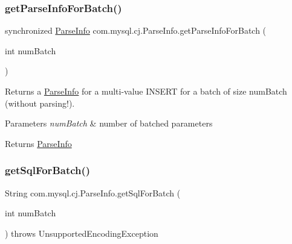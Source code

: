 \mbox{\label{classcom_1_1mysql_1_1cj_1_1_parse_info_afb6755fef767af487192ea4a4f589d24}} 
\subsubsection{\texorpdfstring{get\+Parse\+Info\+For\+Batch()}{getParseInfoForBatch()}}
{\footnotesize\ttfamily synchronized \mbox{\hyperlink{classcom_1_1mysql_1_1cj_1_1_parse_info}{Parse\+Info}} com.\+mysql.\+cj.\+Parse\+Info.\+get\+Parse\+Info\+For\+Batch (\begin{DoxyParamCaption}\item[{int}]{num\+Batch }\end{DoxyParamCaption})}

Returns a \mbox{\hyperlink{classcom_1_1mysql_1_1cj_1_1_parse_info}{Parse\+Info}} for a multi-\/value I\+N\+S\+E\+RT for a batch of size num\+Batch (without parsing!).


\begin{DoxyParams}{Parameters}
{\em num\+Batch} & number of batched parameters \\
\hline
\end{DoxyParams}
\begin{DoxyReturn}{Returns}
\mbox{\hyperlink{classcom_1_1mysql_1_1cj_1_1_parse_info}{Parse\+Info}} 
\end{DoxyReturn}
\mbox{\label{classcom_1_1mysql_1_1cj_1_1_parse_info_a7a1053a89e14ce278d2617ee0f56010f}} 
\subsubsection{\texorpdfstring{get\+Sql\+For\+Batch()}{getSqlForBatch()}\hspace{0.1cm}{\footnotesize\ttfamily [1/2]}}
{\footnotesize\ttfamily String com.\+mysql.\+cj.\+Parse\+Info.\+get\+Sql\+For\+Batch (\begin{DoxyParamCaption}\item[{int}]{num\+Batch }\end{DoxyParamCaption}) throws Unsupported\+Encoding\+Exception}

